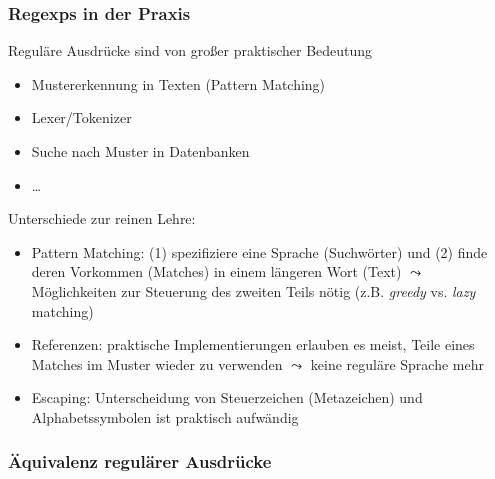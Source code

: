 \documentclass[onlymath]{beamer}
\begin{document}
\begin{frame}\frametitle{Regexps in der Praxis}

Reguläre Ausdrücke sind von großer praktischer Bedeutung
\begin{itemize}
\item Mustererkennung in Texten (Pattern Matching)
\item Lexer/Tokenizer
\item Suche nach Muster in Datenbanken
\item \ldots
\end{itemize}\pause

Unterschiede zur reinen Lehre:
\begin{itemize}
\item \alert{Pattern Matching:} (1) spezifiziere eine Sprache (Suchwörter) und (2) finde deren Vorkommen (Matches) in einem längeren Wort (Text) $\leadsto$ Möglichkeiten zur Steuerung des zweiten Teils nötig (z.B. \emph{greedy} vs. \emph{lazy} matching)
\item \alert{Referenzen:} praktische Implementierungen erlauben es meist, Teile eines Matches im Muster wieder zu verwenden $\leadsto$ keine reguläre Sprache mehr
\item \alert{Escaping:} Unterscheidung von Steuerzeichen (Metazeichen) und Alphabetssymbolen ist praktisch aufwändig
\end{itemize}

\end{frame}

\begin{frame}\frametitle{Äquivalenz regulärer Ausdrücke}

\medskip


\end{frame}
\end{document}
